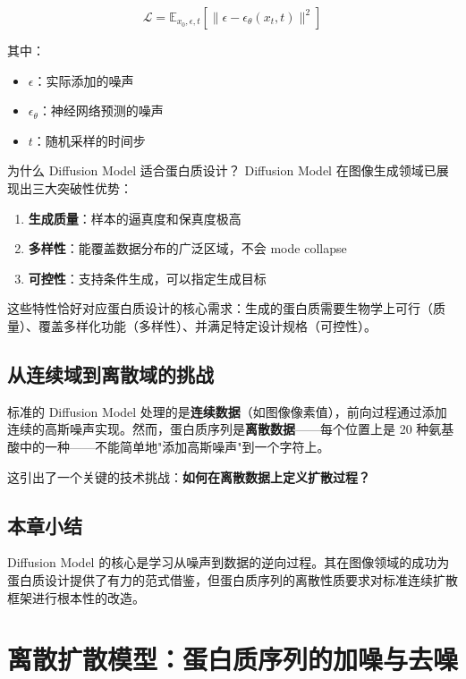 \documentclass[a4paper]{article}
\begin{document}
$$\mathcal{L} = \mathbb{E}_{x_0, \epsilon, t} \left[ \| \epsilon - \epsilon_\theta(x_t, t) \|^2 \right]$$

其中：
\begin{itemize}
    \item $\epsilon$：实际添加的噪声
    \item $\epsilon_\theta$：神经网络预测的噪声
    \item $t$：随机采样的时间步
\end{itemize}

\begin{importantbox}{为什么 Diffusion Model 适合蛋白质设计？}
Diffusion Model 在图像生成领域已展现出三大突破性优势：
\begin{enumerate}
    \item \textbf{生成质量}：样本的逼真度和保真度极高
    \item \textbf{多样性}：能覆盖数据分布的广泛区域，不会 mode collapse
    \item \textbf{可控性}：支持条件生成，可以指定生成目标
\end{enumerate}
这些特性恰好对应蛋白质设计的核心需求：生成的蛋白质需要生物学上可行（质量）、覆盖多样化功能（多样性）、并满足特定设计规格（可控性）。
\end{importantbox}

\subsection{从连续域到离散域的挑战}

标准的 Diffusion Model 处理的是\textbf{连续数据}（如图像像素值），前向过程通过添加连续的高斯噪声实现。然而，蛋白质序列是\textbf{离散数据}——每个位置上是 20 种氨基酸中的一种——不能简单地"添加高斯噪声"到一个字符上。

这引出了一个关键的技术挑战：\textbf{如何在离散数据上定义扩散过程？}

\subsection{本章小结}

Diffusion Model 的核心是学习从噪声到数据的逆向过程。其在图像领域的成功为蛋白质设计提供了有力的范式借鉴，但蛋白质序列的离散性质要求对标准连续扩散框架进行根本性的改造。


\section{离散扩散模型：蛋白质序列的加噪与去噪}
\end{document}
